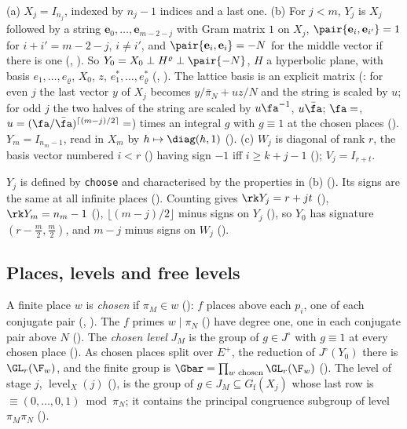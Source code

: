 \begin{definition}
\label{ub-objects:def:spaces}
(a) $X_j=I_{n_j}$, indexed by $n_j-1$ indices and a last one. (b) For $j<m$, $Y_j$ is $X_j$
followed by a string $\mathbf e_0,\dots,\mathbf e_{m-2-j}$ with Gram matrix $1$ on $X_j$,
$\pair{\mathbf e_i,\mathbf e_{i'}}=1$ for $i+i'=m-2-j$, $i\ne i'$, and
$\pair{\mathbf e_i,\mathbf e_i}=-N$ for the middle vector if there is one
(, ). So $Y_0=X_0\perp H^\varrho\perp\pair{-N}$,
$H$ a hyperbolic plane, with basis $e_1,\dots,e_\varrho$, $X_0$, $z$, $e^*_1,\dots,e^*_\varrho$
(, ). The lattice basis is an explicit
matrix (: for even $j$ the last vector $y$ of $X_j$ becomes
$y/\bar\pi_N+uz/N$ and the string is scaled by $u$; for odd $j$ the two halves of the string are
scaled by $u\fa^{-1}$, $u\bar\fa$; $\fa=$, $u=(\fa/\bar\fa)^{\lceil(m-j)/2\rceil}=$) times an integral $g$ with $g\equiv1$ at the chosen places
(). $Y_m=I_{n_m-1}$, read in $X_m$ by $h\mapsto\diag(h,1)$
(). (c) $W_j$ is diagonal of rank $r$, the basis vector numbered
$i<r$ () having sign $-1$ iff $i\ge k+j-1$ ();
$V_j=I_{r+t}$.
\end{definition}

$Y_j$ is defined by \texttt{choose} and characterised by the properties in (b)
(). Its signs are the same at all
infinite places (). Counting gives $\rk Y_j=r+jt$
(), $\rk Y_m=n_m-1$ (), $\lfloor(m-j)/2\rfloor$
minus signs on $Y_j$ (), so $Y_0$ has signature $(r-\frac m2,\frac
m2)$, and $m-j$ minus signs on $W_j$ ().

\subsection{Places, levels and free levels}\label{ub-objects:sec:levels}

A finite place $w$ is \emph{chosen} if $\pi_M\in w$ (): $f$ places above
each $p_i$, one of each conjugate pair (,
). The $f$ primes $w\mid\pi_N$ () have
degree one, one in each conjugate pair above $N$ (). The
\emph{chosen level} $J_M$ is the group of $g\in J^\circ$ with $g\equiv1$ at every chosen place
(). As chosen places split over $E^+$, the reduction of $J^\circ(Y_0)$
there is $\GL_r(\F_w)$, and the finite group is $\Gbar=\prod_{w\text{ chosen}}\GL_r(\F_w)$
(). The level of stage $j$, $\operatorname{level}_X(j)$
(), is the group of $g\in J_M\subseteq G_{\mathrm f}(X_j)$ whose last row is
$\equiv(0,\dots,0,1)\bmod\pi_N$; it contains the principal congruence subgroup of level
$\pi_M\pi_N$ ().

